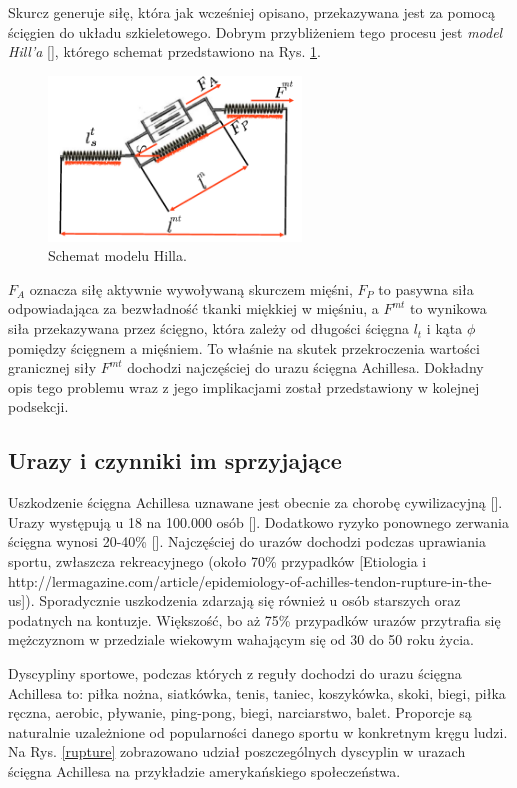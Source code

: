 Skurcz generuje siłę, która jak wcześniej opisano, przekazywana jest za pomocą ścięgien do układu szkieletowego. Dobrym przybliżeniem tego procesu jest \textit{model Hill'a} [], którego schemat przedstawiono na Rys. \ref{hill-model}.

\begin{figure}[h!]
	\centering
	\includegraphics[width=0.6\textwidth]{figures/Hill.png}
	\caption{Schemat modelu Hilla.}
	\label{hill-model}
\end{figure}

$F_A$ oznacza siłę aktywnie wywoływaną skurczem mięśni, $F_P$ to pasywna siła odpowiadająca za bezwładność tkanki miękkiej w mięśniu, a $F^{mt}$ to wynikowa siła przekazywana przez ścięgno, która zależy od długości ścięgna $l_t$ i kąta $\phi$ pomiędzy ścięgnem a mięśniem. To właśnie na skutek przekroczenia wartości granicznej siły $F^{mt}$ dochodzi najczęściej do urazu ścięgna Achillesa. Dokładny opis tego problemu wraz z jego implikacjami został przedstawiony w kolejnej podsekcji.

\subsection{Urazy i czynniki im sprzyjające}

Uszkodzenie ścięgna Achillesa uznawane jest obecnie za chorobę cywilizacyjną []. Urazy występują u 18 na 100.000 osób []. Dodatkowo ryzyko ponownego zerwania ścięgna wynosi 20-40\% []. Najczęściej do urazów dochodzi podczas uprawiania sportu, zwłaszcza rekreacyjnego (około 70\% przypadków [Etiologia i http://lermagazine.com/article/epidemiology-of-achilles-tendon-rupture-in-the-us]). Sporadycznie uszkodzenia zdarzają się również u osób starszych oraz podatnych na kontuzje. Większość, bo aż 75\% przypadków urazów przytrafia się mężczyznom w przedziale wiekowym wahającym się od 30 do 50 roku życia.

Dyscypliny sportowe, podczas których z reguły dochodzi do urazu ścięgna Achillesa to: piłka nożna, siatkówka, tenis, taniec, koszykówka, skoki, biegi, piłka ręczna, aerobic, pływanie, ping-pong, biegi, narciarstwo, balet. Proporcje są naturalnie uzależnione od popularności danego sportu w konkretnym kręgu ludzi. Na Rys. \ref{rupture} zobrazowano udział poszczególnych dyscyplin w urazach ścięgna Achillesa na przykładzie amerykańskiego społeczeństwa. 

